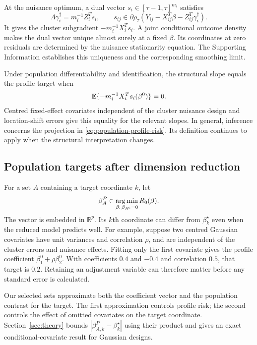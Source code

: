At the nuisance optimum, a dual vector
$s_i\in[\tau-1,\tau]^{m_i}$ satisfies
\[
 \Lambda\gamma_i^\dagger=m_i^{-1}Z_i^Ts_i,\qquad
 s_{ij}\in\partial\rho_\tau
       (Y_{ij}-X_{ij}^T\beta-Z_{ij}^T\gamma_i^\dagger).
\]
It gives the cluster subgradient $-m_i^{-1}X_i^Ts_i$. A joint
conditional outcome density makes the dual vector unique almost surely
at a fixed $\beta$. Its coordinates at zero residuals are determined
by the nuisance stationarity equation. The Supporting Information
establishes this uniqueness and the corresponding smoothing limit.

Under population differentiability and identification, the structural
slope equals the profile target when
\begin{equation}\label{eq:structural-orthogonality}
 \mathbb{E}\{-m_i^{-1}X_i^Ts_i(\beta^0)\}=0.
\end{equation}
Centred fixed-effect covariates independent of the cluster nuisance
design and location-shift errors give this equality for the relevant
slopes. In general, inference concerns the projection in
\eqref{eq:population-profile-risk}. Its definition continues to apply
when the structural interpretation changes.

\subsection{Population targets after dimension reduction}\label{subsec:selected-target}

For a set $A$ containing a target coordinate $k$, let
\begin{equation}\label{eq:selected-population-target}
 \beta_A^P\in\operatorname*{arg\,min}_{\beta:\,\beta_{A^c}=0}R_0(\beta).
\end{equation}
The vector is embedded in $\mathbb R^p$. Its $k$th coordinate can
differ from $\beta_k^\star$ even when the reduced model predicts well.
For example, suppose two centred Gaussian covariates have unit
variances and correlation $\rho$, and are independent of the cluster
errors and nuisance effects. Fitting only the first covariate gives
the profile coefficient $\beta_1^0+\rho\beta_2^0$. With coefficients
$0.4$ and $-0.4$ and correlation $0.5$, that target is $0.2$.
Retaining an adjustment variable can therefore matter before any
standard error is calculated.

Our selected sets approximate both the coefficient vector and the
population contrast for the target. The first approximation controls
profile risk; the second controls the effect of omitted covariates on
the target coordinate. Section~\ref{sec:theory} bounds
$|\beta_{A,k}^P-\beta_k^\star|$ using their product and gives an exact
conditional-covariate result for Gaussian designs.

